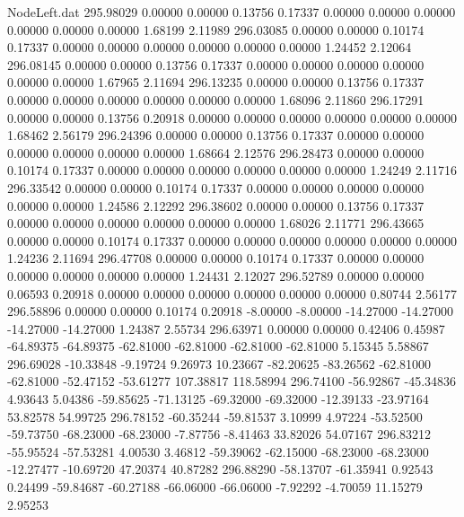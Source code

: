 \begin{filecontents}{NodeLeft.dat}
 295.98029    0.00000    0.00000     0.13756    0.17337    0.00000    0.00000    0.00000    0.00000    0.00000    0.00000    1.68199    2.11989
 296.03085    0.00000    0.00000     0.10174    0.17337    0.00000    0.00000    0.00000    0.00000    0.00000    0.00000    1.24452    2.12064
 296.08145    0.00000    0.00000     0.13756    0.17337    0.00000    0.00000    0.00000    0.00000    0.00000    0.00000    1.67965    2.11694
 296.13235    0.00000    0.00000     0.13756    0.17337    0.00000    0.00000    0.00000    0.00000    0.00000    0.00000    1.68096    2.11860
 296.17291    0.00000    0.00000     0.13756    0.20918    0.00000    0.00000    0.00000    0.00000    0.00000    0.00000    1.68462    2.56179
 296.24396    0.00000    0.00000     0.13756    0.17337    0.00000    0.00000    0.00000    0.00000    0.00000    0.00000    1.68664    2.12576
 296.28473    0.00000    0.00000     0.10174    0.17337    0.00000    0.00000    0.00000    0.00000    0.00000    0.00000    1.24249    2.11716
 296.33542    0.00000    0.00000     0.10174    0.17337    0.00000    0.00000    0.00000    0.00000    0.00000    0.00000    1.24586    2.12292
 296.38602    0.00000    0.00000     0.13756    0.17337    0.00000    0.00000    0.00000    0.00000    0.00000    0.00000    1.68026    2.11771
 296.43665    0.00000    0.00000     0.10174    0.17337    0.00000    0.00000    0.00000    0.00000    0.00000    0.00000    1.24236    2.11694
 296.47708    0.00000    0.00000     0.10174    0.17337    0.00000    0.00000    0.00000    0.00000    0.00000    0.00000    1.24431    2.12027
 296.52789    0.00000    0.00000     0.06593    0.20918    0.00000    0.00000    0.00000    0.00000    0.00000    0.00000    0.80744    2.56177
 296.58896    0.00000    0.00000     0.10174    0.20918   -8.00000   -8.00000  -14.27000  -14.27000  -14.27000  -14.27000    1.24387    2.55734
 296.63971    0.00000    0.00000     0.42406    0.45987  -64.89375  -64.89375  -62.81000  -62.81000  -62.81000  -62.81000    5.15345    5.58867
 296.69028  -10.33848   -9.19724     9.26973   10.23667  -82.20625  -83.26562  -62.81000  -62.81000  -52.47152  -53.61277  107.38817  118.58994
 296.74100  -56.92867  -45.34836     4.93643    5.04386  -59.85625  -71.13125  -69.32000  -69.32000  -12.39133  -23.97164   53.82578   54.99725
 296.78152  -60.35244  -59.81537     3.10999    4.97224  -53.52500  -59.73750  -68.23000  -68.23000   -7.87756   -8.41463   33.82026   54.07167
 296.83212  -55.95524  -57.53281     4.00530    3.46812  -59.39062  -62.15000  -68.23000  -68.23000  -12.27477  -10.69720   47.20374   40.87282
 296.88290  -58.13707  -61.35941     0.92543    0.24499  -59.84687  -60.27188  -66.06000  -66.06000   -7.92292   -4.70059   11.15279    2.95253

\end{filecontents}
